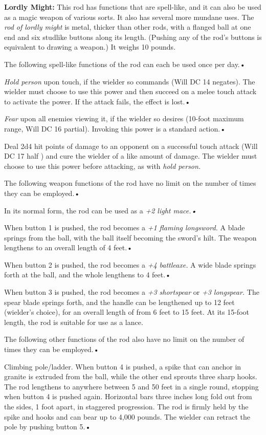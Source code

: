 \textbf{Lordly Might: }This rod has functions that are spell-like, and it can also 
be used as a magic weapon of various sorts. It also has several more mundane uses. 
The \textit{rod of lordly might }is metal, thicker than other rods, with a flanged 
ball at one end and six studlike buttons along its length. (Pushing any of the 
rod's buttons is equivalent to drawing a weapon.) It weighs 10 pounds.

The following spell-like functions of the rod can each be used once per day.•

\textit{Hold person }upon touch, if the wielder so commands (Will DC 14 negates). 
The wielder must choose to use this power and then succeed on a melee touch attack 
to activate the power. If the attack fails, the effect is lost.•

\textit{Fear }upon all enemies viewing it, if the wielder so desires (10-foot maximum 
range, Will DC 16 partial). Invoking this power is a standard action.•

Deal 2d4 hit points of damage to an opponent on a successful touch attack (Will 
DC 17 half ) and cure the wielder of a like amount of damage. The wielder must 
choose to use this power before attacking, as with \textit{hold person.}

The following weapon functions of the rod have no limit on the number of times 
they can be employed.•

In its normal form, the rod can be used as a \textit{+2 light mace.•}

When button 1 is pushed, the rod becomes a \textit{+1 flaming longsword. }A blade 
springs from the ball, with the ball itself becoming the sword's hilt. The weapon 
lengthens to an overall length of 4 feet.•

When button 2 is pushed, the rod becomes a \textit{+4 battleaxe. }A wide blade 
springs forth at the ball, and the whole lengthens to 4 feet.•

When button 3 is pushed, the rod becomes a \textit{+3 shortspear }or \textit{+3 
longspear. }The spear blade springs forth, and the handle can be lengthened up 
to 12 feet (wielder's choice), for an overall length of from 6 feet to 15 feet. 
At its 15-foot length, the rod is suitable for use as a lance.

The following other functions of the rod also have no limit on the number of times 
they can be employed.•

Climbing pole/ladder. When button 4 is pushed, a spike that can anchor in granite 
is extruded from the ball, while the other end sprouts three sharp hooks. The rod 
lengthens to anywhere between 5 and 50 feet in a single round, stopping when button 
4 is pushed again. Horizontal bars three inches long fold out from the sides, 1 
foot apart, in staggered progression. The rod is firmly held by the spike and hooks 
and can bear up to 4,000 pounds. The wielder can retract the pole by pushing button 
5.•

